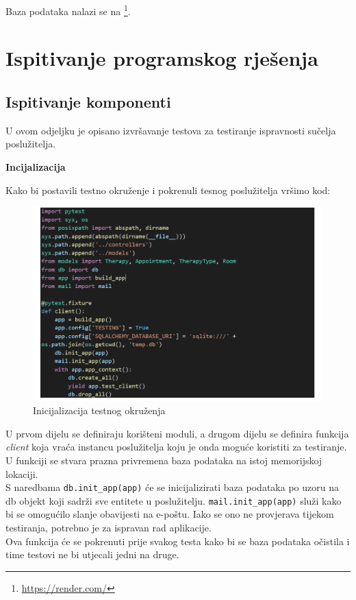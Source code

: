 			 Baza podataka nalazi se na \footnote{\url{https://render.com/}}.
			
			
			\eject 
		
	
		\section{Ispitivanje programskog rješenja}
			
			\subsection{Ispitivanje komponenti}
			
			U ovom odjeljku je opisano izvršavanje testova za testiranje ispravnosti sučelja poslužitelja. 
			
			
			\textbf{Incijalizacija}
			
			
			Kako bi postavili testno okruženje i pokrenuli tesnog poslužitelja vršimo kod:
			
			\begin{figure}[H]
				\includegraphics[scale=0.3]{slike/testno_okruzenje.PNG} %
				\centering
				\caption{Inicijalizacija testnog okruženja}
				\label{fig:testno_okruzenje}
			\end{figure}
			
			U prvom dijelu se definiraju korišteni moduli, a drugom dijelu se definira funkcija \textit{client} koja vraća instancu poslužitelja koju je onda moguće koristiti za testiranje. U funkciji se stvara prazna privremena baza podataka na istoj memorijskoj lokaciji. \\
S naredbama \texttt{db.init\_app(app)} će se inicijalizirati baza podataka po uzoru na db objekt koji sadrži sve entitete u poslužitelju. \texttt{mail.init\_app(app)} služi kako bi se omogućilo slanje obavijesti na e-poštu. Iako se ono ne provjerava tijekom testiranja, potrebno je za ispravan rad aplikacije. \\
Ova funkcija će se pokrenuti prije svakog testa kako bi se baza podataka očistila i time testovi ne bi utjecali jedni na druge.


